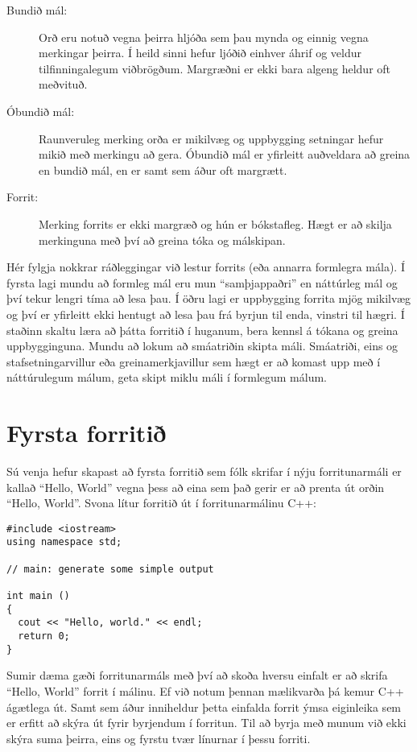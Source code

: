 
\begin{description}

\item[Bundið mál:] Orð eru notuð vegna þeirra hljóða sem þau mynda og einnig vegna merkingar þeirra.
Í heild sinni hefur ljóðið einhver áhrif og veldur tilfinningalegum viðbrögðum.
Margræðni er ekki bara algeng heldur oft meðvituð.

\item[Óbundið mál:] Raunveruleg merking orða er mikilvæg og uppbygging setningar hefur mikið með merkingu að gera.
Óbundið mál er yfirleitt auðveldara að greina en bundið mál, en er samt sem áður oft margrætt. 

\item[Forrit:] Merking forrits er ekki margræð og hún er bókstafleg.
Hægt er að skilja merkinguna með því að greina tóka og málskipan. 

\end{description}

Hér fylgja nokkrar ráðleggingar við lestur forrits (eða annarra formlegra mála).
Í fyrsta lagi mundu að formleg mál eru mun ``samþjappaðri'' en náttúrleg mál og því tekur lengri tíma að lesa þau.
Í öðru lagi er uppbygging forrita mjög mikilvæg og því er yfirleitt ekki hentugt að lesa þau frá byrjun til enda, vinstri til hægri.
Í staðinn skaltu læra að þátta forritið í huganum, bera kennsl á tókana og greina uppbygginguna.
Mundu að lokum að smáatriðin skipta máli.  
Smáatriði, eins og stafsetningarvillur eða greinamerkjavillur sem hægt er að komast upp með í náttúrulegum málum, geta skipt miklu máli í formlegum málum.


\section{Fyrsta forritið}
\label{hello}

Sú venja hefur skapast að fyrsta forritið sem fólk skrifar í nýju forritunarmáli er kallað ``Hello, World'' vegna þess að eina sem það gerir er að prenta út orðin ``Hello, World''.
Svona lítur forritið út í forritunarmálinu C++: 

\begin{verbatim}
#include <iostream>
using namespace std;

// main: generate some simple output

int main ()
{
  cout << "Hello, world." << endl;
  return 0;
}
\end{verbatim}
%
Sumir dæma gæði forritunarmáls með því að skoða hversu einfalt er að skrifa ``Hello, World'' forrit í málinu.
Ef við notum þennan mælikvarða þá kemur C++ ágætlega út.
Samt sem áður inniheldur þetta einfalda forrit ýmsa eiginleika sem er erfitt að skýra út fyrir byrjendum í forritun.
Til að byrja með munum við ekki skýra suma þeirra, eins og fyrstu tvær línurnar í þessu forriti.

